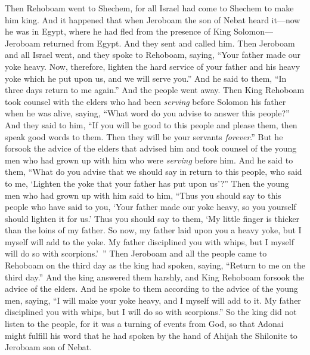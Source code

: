 \begin{biblechapter} %
 Then Rehoboam went to Shechem, for all Israel had come to Shechem to make him king.
\verse And it happened that when Jeroboam the son of Nebat heard it—now he was in Egypt, where he had fled from the presence of King Solomon—Jeroboam returned from Egypt.
\verse And they sent and called him. Then Jeroboam and all Israel went, and they spoke to Rehoboam, saying,
\verse “Your father made our yoke heavy. Now, therefore, lighten the hard service of your father and his heavy yoke which he put upon us, and we will serve you.”
\verse And he said to them, “In three days return to me again.” And the people went away.
\verse Then King Rehoboam took counsel with the elders who had been \textit{serving} before Solomon his father when he was alive, saying, “What word do you advise to answer this people?”
\verse And they said to him, “If you will be good to this people and please them, then speak good words to them. Then they will be your servants \textit{forever}.”
\verse But he forsook the advice of the elders that advised him and took counsel of the young men who had grown up with him who were \textit{serving} before him.
\verse And he said to them, “What do you advise that we should say in return to this people, who said to me, ‘Lighten the yoke that your father has put upon us’?”
\verse Then the young men who had grown up with him said to him, “Thus you should say to this people who have said to you, ‘Your father made our yoke heavy, so you yourself should lighten it for us.’ Thus you should say to them, ‘My little finger is thicker than the loins of my father.
\verse So now, my father laid upon you a heavy yoke, but I myself will add to the yoke. My father disciplined you with whips, but I myself will do so with scorpions.’ ”
\verse Then Jeroboam and all the people came to Rehoboam on the third day as the king had spoken, saying, “Return to me on the third day.”
\verse And the king answered them harshly, and King Rehoboam forsook the advice of the elders.
\verse And he spoke to them according to the advice of the young men, saying, “I will make your yoke heavy, and I myself will add to it. My father disciplined you with whips, but I will do so with scorpions.”
\verse So the king did not listen to the people, for it was a turning of events from God, so that Adonai might fulfill his word that he had spoken by the hand of Ahijah the Shilonite to Jeroboam son of Nebat.

\end{biblechapter}
